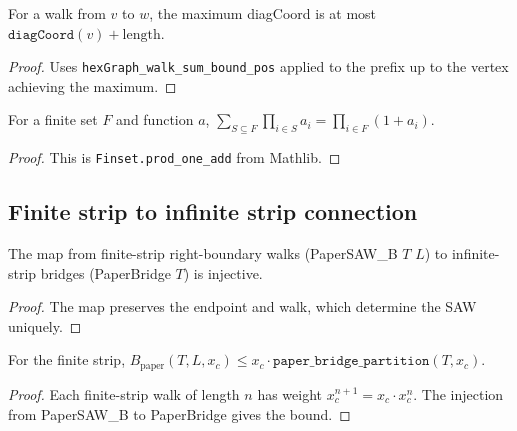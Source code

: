 \begin{lemma}
\begin{enumerate}
\begin{lemma}\label{lem:walk-max-dc-bound}
\leanok
  For a walk from $v$ to $w$, the maximum diagCoord is at most
  $\texttt{diagCoord}(v) + \text{length}$.
\end{lemma}
\begin{proof}\leanok
  Uses \texttt{hexGraph\_walk\_sum\_bound\_pos} applied to the prefix
  up to the vertex achieving the maximum.
\end{proof}

\begin{lemma}\label{lem:powerset-prod}
\leanok
  For a finite set $F$ and function $a$,
  $\sum_{S \subseteq F} \prod_{i \in S} a_i = \prod_{i \in F} (1 + a_i)$.
\end{lemma}
\begin{proof}\leanok
  This is \texttt{Finset.prod\_one\_add} from Mathlib.
\end{proof}

\subsection{Finite strip to infinite strip connection}

\begin{lemma}\label{lem:sawb-to-bridge}
\leanok
  The map from finite-strip right-boundary walks (PaperSAW\_B $T$ $L$)
  to infinite-strip bridges (PaperBridge $T$) is injective.
\end{lemma}
\begin{proof}\leanok
  The map preserves the endpoint and walk, which determine the SAW uniquely.
\end{proof}

\begin{lemma}\label{lem:bpaper-le-bridge}
\leanok
  For the finite strip, $B_{\text{paper}}(T,L,x_c) \leq x_c \cdot
  \texttt{paper\_bridge\_partition}(T, x_c)$.
\end{lemma}
\begin{proof}\leanok
  Each finite-strip walk of length $n$ has weight $x_c^{n+1} = x_c \cdot x_c^n$.
  The injection from PaperSAW\_B to PaperBridge gives the bound.
\end{proof}


\end{enumerate}
\end{lemma}
